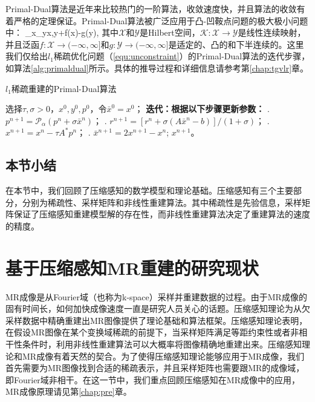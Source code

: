 Primal-Dual\cite{pd}算法是近年来比较热门的一阶算法，收敛速度快，并且算法的收敛有着严格的定理保证。Primal-Dual算法被广泛应用于凸-凹鞍点问题的极大极小问题中：
\beq
\min_{x\in{}}\max_{y\in{}}\quad\langle {}x,y\rangle+f(x)-g(y),
\label{equ:saddle1}
\eeq
其中$\mathcal{X}$和$\mathcal{Y}$是Hilbert空间，$\mathcal{K}:\mathcal{X}\rightarrow\mathcal{Y}$是线性连续映射，并且泛函$f:\mathcal{X}\rightarrow(-\infty,\infty]$和$g:\mathcal{Y}\rightarrow(-\infty,\infty]$是适定的、凸的和下半连续的。这里我们仅给出$l_1$稀疏优化问题（\ref{equ:unconstraint}）的Primal-Dual算法的迭代步骤，如算法\ref{alg:primaldual}所示。具体的推导过程和详细信息请参考第\ref{chap:tgvlr}章。
\begin{algorithm}
	\caption{$l_1$稀疏重建的Primal-Dual算法}
	\label{alg:primaldual}
	\begin{algorithmic}
		\REQUIRE 选择$\tau, \sigma>0$，$x^0,y^0,p^0$，令$\bar{x}^0=x^0$；
		\INDSTATE[-1.25] \textbf{迭代：根据以下步骤更新参数：}	
		. $p^{n+1}=\mathcal{P}_\alpha(p^n+\sigma\bar{x}^n)$；
		. $r^{n+1}=[r^n+\sigma(A\bar{x}^n-b)]/(1+\sigma)$；
		. $x^{n+1}=x^n-\tau A^*p^n$；
		. $\bar{x}^{n+1}=2x^{n+1}-x^n$;
		\ENSURE $x^{n+1}$。
	\end{algorithmic}
\end{algorithm}

\subsection{本节小结}
在本节中，我们回顾了压缩感知的数学模型和理论基础。压缩感知有三个主要部分，分别为稀疏性、采样矩阵和非线性重建算法。其中稀疏性是先验信息，采样矩阵保证了压缩感知重建模型解的存在性，而非线性重建算法决定了重建算法的速度的精度。

\section{基于压缩感知MR重建的研究现状}
\label{sec:csmri}
MR成像是从Fourier域（也称为k-space）采样并重建数据的过程。由于MR成像的固有时间长，如何加快成像速度一直是研究人员关心的话题。压缩感知理论为从欠采样数据中精确重建出MR图像提供了理论基础和算法框架。压缩感知理论表明，在假设MR图像在某个变换域稀疏的前提下，当采样矩阵满足等距约束性或者非相干性条件时\cite{Donoho2006Compressed}，利用非线性重建算法可以大概率将图像精确地重建出来。压缩感知理论和MR成像有着天然的契合。为了使得压缩感知理论能够应用于MR成像，我们首先需要为MR图像找到合适的稀疏表示，并且采样矩阵也需要跟MR的成像域，即Fourier域非相干。在这一节中，我们重点回顾压缩感知在MR成像中的应用，MR成像原理请见第\ref{chap:pre}章。

